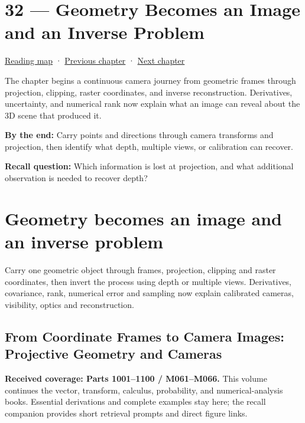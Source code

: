 \hypertarget{02-foundations-ii-ch032}{}
\section{32 --- Geometry Becomes an Image and an Inverse Problem}\label{geometry-becomes-an-image-and-an-inverse-problem}

\href{Chapter\%20Edition/01\%20-\%20Computing\%20Foundations/00\%20-\%20Reading\%20Map}{Reading map} · \hyperref[02-foundations-ii-ch031]{Previous chapter} · \hyperref[02-foundations-ii-ch033]{Next chapter}

The chapter begins a continuous camera journey from geometric frames through projection, clipping, raster coordinates, and inverse reconstruction. Derivatives, uncertainty, and numerical rank now explain what an image can reveal about the 3D scene that produced it.

\textbf{By the end:} Carry points and directions through camera transforms and projection, then identify what depth, multiple views, or calibration can recover.

\textbf{Recall question:} Which information is lost at projection, and what additional observation is needed to recover depth?

\section{Geometry becomes an image and an inverse problem}\label{geometry-becomes-an-image-and-an-inverse-problem-1}

Carry one geometric object through frames, projection, clipping and raster coordinates, then invert the process using depth or multiple views. Derivatives, covariance, rank, numerical error and sampling now explain calibrated cameras, visibility, optics and reconstruction.

\subsection{From Coordinate Frames to Camera Images: Projective Geometry and Cameras}\label{from-coordinate-frames-to-camera-images-projective-geometry-and-cameras}

\textbf{Received coverage: Parts 1001--1100 / M061--M066.} This volume continues the vector, transform, calculus, probability, and numerical-analysis books. Essential derivations and complete examples stay here; the recall companion provides short retrieval prompts and direct figure links.

